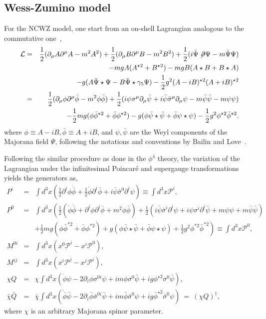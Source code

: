 \documentclass[a4paper,a4paper]{article}
\def\diracop{\not\negthinspace\partial}
\begin{document}
\subsection{Wess-Zumino model}
For the NCWZ model, one start from an on-shell Lagrangian
analogous to the commutative one~\cite{Soh},
\begin{eqnarray}
\mathcal{L} & = & \frac 12(\partial_\mu A\partial^\mu A-m^2A^2)
+\frac 12(\partial_\mu B\partial^\mu B-m^2B^2)
+\frac 12(i\bar{\Psi}\diracop\Psi-m\bar{\Psi}\Psi) \nonumber \\
 & & -mgA(A^{\star 2}+B^{\star 2})-mgB(A\star B+B\star A) \nonumber \\
 &&-g(A\bar{\Psi}\star\Psi-B\bar{\Psi}\star\gamma_5\Psi)
 -\frac 12g^2(A-iB)^{\star 2}(A+iB)^{\star 2} \\
&=&\frac 12(\partial_{\mu} \phi\partial^{\mu} \bar{\phi}-m^2\phi\bar{\phi})
+\frac 12(i\psi\sigma^{\mu}\partial_{\mu}\bar{\psi}
+i\bar{\psi}\bar{\sigma}^\mu\partial_\mu \psi-m\bar{\psi}\bar{\psi}-m\psi\psi) \nonumber \\
 & & -\frac 12 mg(\phi\bar{\phi}^{\star 2}+\bar{\phi}\phi^{\star 2})
 -g(\phi\bar{\psi}\star\bar{\psi}+\bar{\phi}\psi\star\psi)
 -\frac 12 g^2\phi^{\star 2}\bar{\phi}^{\star 2}.
\end{eqnarray}
where $\phi\equiv A-iB,\bar{\phi}\equiv A+iB $, and $\psi,\bar{\psi}$ are the Weyl components 
of the Majorana field $\Psi$,
 following the notations and conventions by Bailin and Love~\cite{BL}. 

Following the similar procedure as done in the $\phi^4$ theory, the variation of 
the Lagrangian under the infinitesimal Poincar\'{e} and supergauge transformations 
yields the generators as,   
\begin{eqnarray}
P^i & = & \int d^3x\left(\frac 12\partial^i \phi\dot{\bar{\phi}}+\frac 12\dot{\phi}\partial^i\bar{\phi}
+i\bar{\psi}\bar{\sigma}^0\partial^i\psi\right)\equiv \int d^3x \mathcal{P}^i, \\
P^0 & = & \int d^3x\left(\frac 12(\dot{\phi}\dot{\bar{\phi}}
+\partial^i\phi\partial^i\bar{\phi}
+m^2\phi\bar{\phi})
+\frac 12(i\bar{\psi}\bar{\sigma}^i\partial^i\psi
+i\psi\sigma^i\partial^i\bar{\psi}
+m\psi\psi+m\bar{\psi}\bar{\psi}) \right.\nonumber\\
&&\left.+\frac 12 mg(\phi\bar{\phi}^{*2}+\bar{\phi}\phi^{*2})
  +g(\phi\bar{\psi}\star\bar{\psi}+\bar{\phi}\psi\star\psi)
  +\frac 12 g^2\phi^{*2}\bar{\phi}^{*2}\right)
  \equiv \int d^3x\mathcal{P}^0, \\ 
M^{0i} & = & \int d^3x\left(x^0\mathcal{P}^i-x^i\mathcal{P}^0\right),\\
M^{ij} & = & \int d^3x\left(x^i\mathcal{P}^j-x^j\mathcal{P}^i\right),\\
\chi Q & = & \chi\int d^3x\left(\dot{\phi}\psi-2\partial_i\phi\sigma^{0i}\psi
+im\phi\sigma^{0}\bar{\psi}+ig\phi^{\star 2}\sigma^{0}\bar{\psi}\right),\\
\bar{\chi}\bar{Q} & = & \bar{\chi}\int d^3x\left(\dot{\bar{\phi}}\bar{\psi}
-2\partial_i\bar{\phi}\bar{\sigma}^{0i}\bar{\psi}
+im\bar{\phi}\bar{\sigma}^{0}\psi+ig\bar{\phi}^{\star 2}\bar{\sigma}^{0}\psi\right)
~=~(\chi Q)^\dag,
\end{eqnarray}
where $\chi$ is an arbitrary Majorana spinor parameter.
\end{document}
